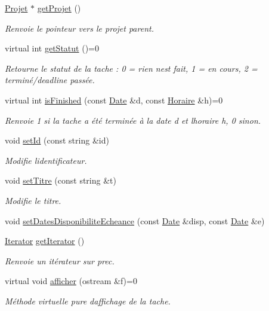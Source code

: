 \begin{DoxyCompactItemize}
\hyperlink{class_projet}{Projet} $\ast$ \hyperlink{class_tache_a18bda9873a4643a7bebe4905110e3814}{get\+Projet} ()
\begin{DoxyCompactList}\small\item\em Renvoie le pointeur vers le projet parent. \end{DoxyCompactList}\item 
virtual int \hyperlink{class_tache_ac60426a56aec80b995f30456fc60a256}{get\+Statut} ()=0
\begin{DoxyCompactList}\small\item\em Retourne le statut de la tache \+: 0 = rien n\textquotesingle{}est fait, 1 = en cours, 2 = terminé/deadline passée. \end{DoxyCompactList}\item 
virtual int \hyperlink{class_tache_a495d9d787ef400a510e625e4e51014bd}{is\+Finished} (const \hyperlink{class_t_i_m_e_1_1_date}{Date} \&d, const \hyperlink{class_t_i_m_e_1_1_horaire}{Horaire} \&h)=0
\begin{DoxyCompactList}\small\item\em Renvoie 1 si la tache a été terminée à la date d et l\textquotesingle{}horaire h, 0 sinon. \end{DoxyCompactList}\item 
void \hyperlink{class_tache_a4ea66e1007e692875199d4027e724a85}{set\+Id} (const string \&id)
\begin{DoxyCompactList}\small\item\em Modifie l\textquotesingle{}identificateur. \end{DoxyCompactList}\item 
void \hyperlink{class_tache_a191acd8b10c22b8e7a533aa8f237b907}{set\+Titre} (const string \&t)
\begin{DoxyCompactList}\small\item\em Modifie le titre. \end{DoxyCompactList}\item 
void \hyperlink{class_tache_a56de6bd26a4a5028c01481ccdededd54}{set\+Dates\+Disponibilite\+Echeance} (const \hyperlink{class_t_i_m_e_1_1_date}{Date} \&disp, const \hyperlink{class_t_i_m_e_1_1_date}{Date} \&e)
\item 
\hyperlink{class_tache_1_1_iterator}{Iterator} \hyperlink{class_tache_a709d4d7d5c25604b6e9a5c37b74fa4a6}{get\+Iterator} ()
\begin{DoxyCompactList}\small\item\em Renvoie un itérateur sur prec. \end{DoxyCompactList}\item 
virtual void \hyperlink{class_tache_a2f86a1a329eb7eee7c8ef4491439bc1c}{afficher} (ostream \&f)=0
\begin{DoxyCompactList}\small\item\em Méthode virtuelle pure d\textquotesingle{}affichage de la tache. \end{DoxyCompactList}\end{DoxyCompactItemize}


